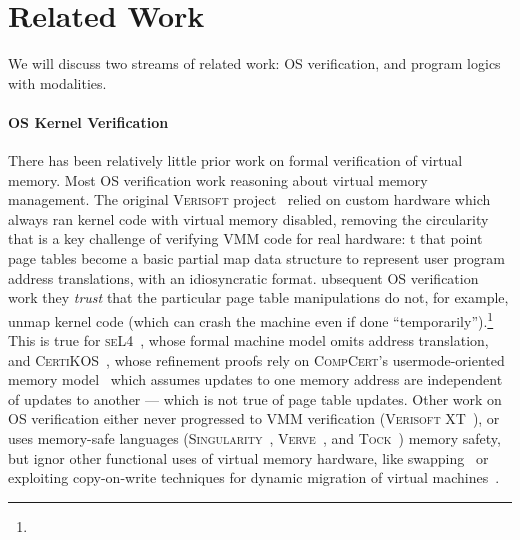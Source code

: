 \section{Related Work}
\label{sec:relwork}
We will discuss two streams of related work: OS verification, and 
program logics with modalities.

\paragraph{OS Kernel Verification}
There has been relatively little prior work on formal verification of virtual memory.
Most OS verification work  reasoning about virtual memory management.
The original \textsc{Verisoft} project~\cite{alkassar2008verisoft,alkassar2010pervasive,alkassar2008formal,dalinger2005verification,hillebrand2005address,alkassar2008formal,starostin2010formal} 
relied on custom hardware which always ran kernel code with virtual memory disabled, removing the circularity that is a key challenge of verifying
VMM code for real hardware: t that point page tables become a basic partial map data structure to represent user program address translations,
with an idiosyncratic format. ubsequent OS verification work
 they \emph{trust}
that the particular page table manipulations do not, for example, unmap kernel code
 (which can crash the machine even if done ``temporarily'').\footnote{}
This is true for \textsc{seL4}~\cite{Klein2009seL4,seL4TOCS,Sewell2013translation}, whose formal machine model omits address translation,
and \textsc{CertiKOS}~\cite{gu15,gu2016certikos,gu2018certikos,chen2016interrupts}, whose refinement proofs rely on
\textsc{CompCert}'s usermode-oriented memory model~\cite{leroy2008formal,leroy2009formally} which assumes
updates to one memory address are independent of updates to another ---
which is not true of page table updates.
Other work on OS verification either never progressed to VMM verification
(\textsc{Verisoft XT}~\cite{cohen2009vcc,cohen2010local,dahlweid2009vcc,cohen2013SOFSEM}),
or uses memory-safe languages
(\textsc{Singularity}~\cite{Fahndrich2006language,Hunt2007singularity,Hunt2007sealing,Barnett2011specsharp}, \textsc{Verve}~\cite{Yang2010Verve},
and \textsc{Tock}~\cite{levy2017multiprogramming}) memory safety, but ignor other functional uses of virtual memory
hardware, like swapping~\cite{Denning1970VM} or exploiting copy-on-write techniques for dynamic migration of virtual machines~\cite{clark2005live}.

